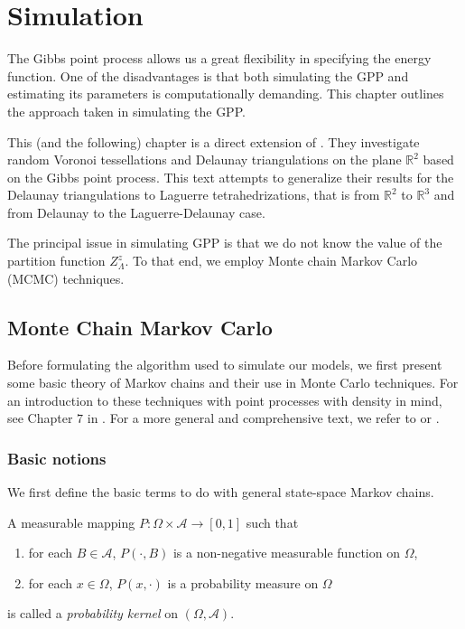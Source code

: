 \chapter{Simulation}\label{ch:simulation}
The Gibbs point process allows us a great flexibility in specifying the energy function. One of the disadvantages is that both simulating the GPP and estimating its parameters is computationally demanding. This chapter outlines the approach taken in simulating the GPP. 

This (and the following) chapter is a direct extension of \cite{DereudreLavancier2011}. They investigate random Voronoi tessellations and Delaunay triangulations on the plane $\mathbb R^2$ based on the Gibbs point process. This text attempts to generalize their results for the Delaunay triangulations to Laguerre tetrahedrizations, that is from $\mathbb R^2$ to $\mathbb R^3$ and from Delaunay to the Laguerre-Delaunay case.

\noindent The principal issue in simulating GPP is that we do not know the value of the partition function $Z^z_\Lambda$. To that end, we employ Monte chain Markov Carlo (MCMC) techniques. 

\section{Monte Chain Markov Carlo}
Before formulating the algorithm used to simulate our models, we first present some basic theory of Markov chains and their use in Monte Carlo techniques. For an introduction to these techniques with point processes with density in mind, see Chapter $7$ in \cite{MollerWaagepetersen2003}. For a more general and comprehensive text, we refer to \cite{RobertCasella2004} or \cite{MeynTweedie1993}.

\subsection{Basic notions}
We first define the basic terms to do with general state-space Markov chains.

\begin{definition}
A measurable mapping $P:\Omega\times \mathcal A \to [0,1]$ such that
\begin{enumerate}
\item for each $B \in \mathcal A$, $P(\cdot, B)$ is a non-negative measurable function on $\Omega$,
\item for each $x \in \Omega$, $P(x,\cdot)$ is a probability measure on $\Omega$
\end{enumerate}
is called a \textit{probability kernel} on $(\Omega, \mathcal A)$.
\end{definition}

